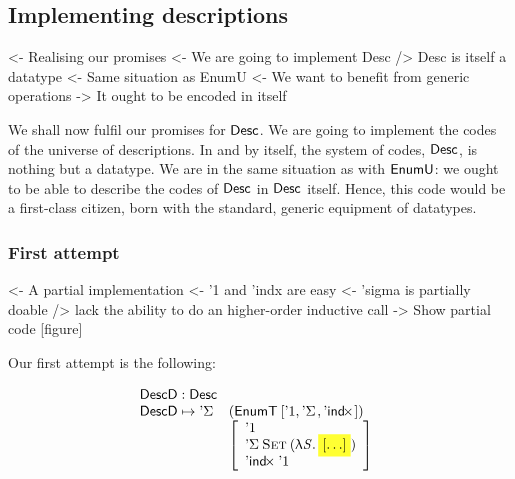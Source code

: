 \subsection{Implementing descriptions}

\begin{wstructure}
<- Realising our promises
    <- We are going to implement Desc
    /> Desc is itself a datatype
        <- Same situation as EnumU
            <- We want to benefit from generic operations
        -> It ought to be encoded in itself
\end{wstructure}

We shall now fulfil our promises for $\Desc$. We are going to
implement the codes of the universe of descriptions. In and by itself,
the system of codes, $\Desc$, is nothing but a datatype. We are in
the same situation as with $\EnumU$: we ought to be able to describe
the codes of $\Desc$ in $\Desc$ itself. Hence, this code would be a
first-class citizen, born with the standard, generic equipment of
datatypes.

\subsubsection{First attempt}

\begin{wstructure}
<- A partial implementation
    <- '1 and 'indx are easy
    <- 'sigma is partially doable
        /> lack the ability to do an higher-order inductive call
    -> Show partial code [figure]
\end{wstructure}

Our first attempt is the following:

\[\stk{
\DescD : \Desc \\
\begin{array}{@{}ll}
\DescD \mapsto \DSigma{\!}{\!} & (\EnumT{[ \DUnit, \DSigma{\!}{\!}, \DIndx{\!} ]})  \\
                               & \left[\begin{array}{l}
                                   \DUnit                                \\
                                   \DSigma{\Set}{(\LAM{\V{S}} \SHED)}      \\
                                   \DIndx{\DUnit}                        \\
                                 \end{array}
                                 \right]
\end{array}
}\]

